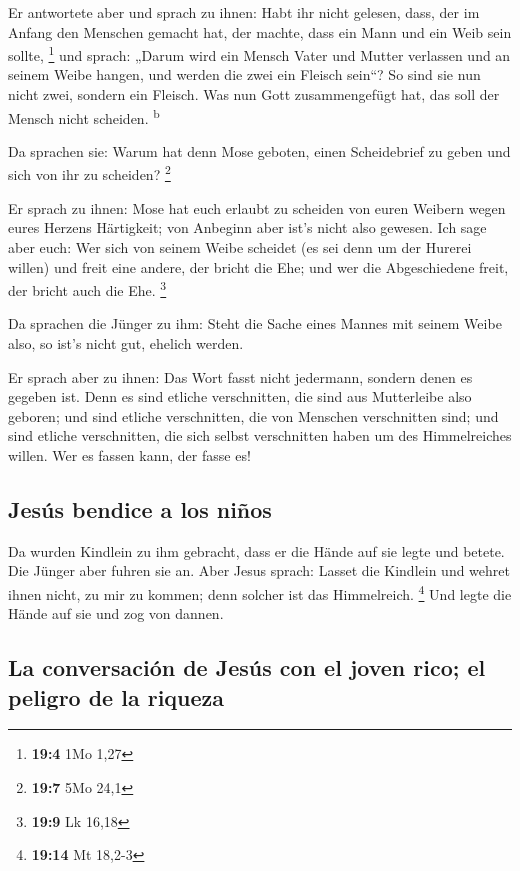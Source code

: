  Er antwortete aber und sprach zu ihnen: Habt ihr nicht
gelesen, dass, der im Anfang den Menschen gemacht hat, der machte, dass
ein Mann und ein Weib sein sollte, \footnote{\textbf{19:4} 1Mo 1,27}
 und sprach: „Darum wird ein Mensch Vater und Mutter
verlassen und an seinem Weibe hangen, und werden die zwei ein Fleisch
sein``?  So sind sie nun nicht zwei, sondern ein Fleisch.
Was nun Gott zusammengefügt hat, das soll der Mensch nicht scheiden.
\textsuperscript{b}

 Da sprachen sie: Warum hat denn Mose geboten, einen
Scheidebrief zu geben und sich von ihr zu scheiden? \footnote{\textbf{19:7}
  5Mo 24,1}

 Er sprach zu ihnen: Mose hat euch erlaubt zu scheiden von
euren Weibern wegen eures Herzens Härtigkeit; von Anbeginn aber ist's
nicht also gewesen.  Ich sage aber euch: Wer sich von
seinem Weibe scheidet (es sei denn um der Hurerei willen) und freit eine
andere, der bricht die Ehe; und wer die Abgeschiedene freit, der bricht
auch die Ehe. \footnote{\textbf{19:9} Lk 16,18}

 Da sprachen die Jünger zu ihm: Steht die Sache eines
Mannes mit seinem Weibe also, so ist's nicht gut, ehelich werden.

 Er sprach aber zu ihnen: Das Wort fasst nicht jedermann,
sondern denen es gegeben ist.  Denn es sind etliche
verschnitten, die sind aus Mutterleibe also geboren; und sind etliche
verschnitten, die von Menschen verschnitten sind; und sind etliche
verschnitten, die sich selbst verschnitten haben um des Himmelreiches
willen. Wer es fassen kann, der fasse es!

\hypertarget{jesuxfas-bendice-a-los-niuxf1os}{%
\subsection{Jesús bendice a los
niños}\label{jesuxfas-bendice-a-los-niuxf1os}}

 Da wurden Kindlein zu ihm gebracht, dass er die Hände
auf sie legte und betete. Die Jünger aber fuhren sie an. 
Aber Jesus sprach: Lasset die Kindlein und wehret ihnen nicht, zu mir zu
kommen; denn solcher ist das Himmelreich. \footnote{\textbf{19:14} Mt
  18,2-3}  Und legte die Hände auf sie und zog von
dannen.

\hypertarget{la-conversaciuxf3n-de-jesuxfas-con-el-joven-rico-el-peligro-de-la-riqueza}{%
\subsection{La conversación de Jesús con el joven rico; el peligro de la
riqueza}\label{la-conversaciuxf3n-de-jesuxfas-con-el-joven-rico-el-peligro-de-la-riqueza}}

